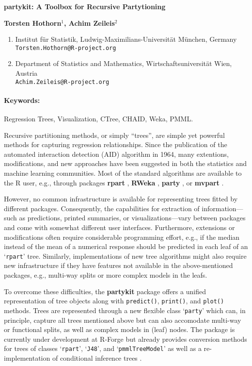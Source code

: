 \documentclass[10pt]{article}
\renewcommand{\title}[1]{\begin{center}{\bf \LARGE #1}\end{center}}
\newcommand{\keywords}{\paragraph{Keywords:}}
\let\code=\texttt
\let\pkg=\textbf
\let\proglang=\textsf
\newcommand{\class}[1]{`\code{#1}'}
\begin{document}
\pagestyle{empty}

\title{\pkg{partykit}: A Toolbox for Recursive Partytioning}

\begin{center}
  {\bf Torsten Hothorn$^{1}$, Achim Zeileis$^{2}$}
\end{center}

\begin{affiliations}
\begin{enumerate}
  \item Institut f\"ur Statistik, Ludwig-Maximilians-Universit\"at M\"unchen, Germany\\
        \texttt{Torsten.Hothorn@R-project.org}
  \item Department of Statistics and Mathematics, Wirtschaftsuniversit\"at Wien, Austria\\
        \texttt{Achim.Zeileis@R-project.org}
\end{enumerate}
\end{affiliations}

\keywords Regression Trees, Visualization, CTree, CHAID, Weka, PMML.

\vskip 0.8cm

Recursive partitioning methods, or simply ``trees'', are simple yet powerful
methods for capturing regression relationships. Since the publication of the
automated interaction detection (AID) algorithm in 1964, many extentions,
modifications, and new approaches have been suggested in both the statistics
and machine learning communities. Most of the standard algorithms are
available to the \proglang{R} user, e.g., through packages
\pkg{rpart} \citep{rpart},
\pkg{RWeka} \citep{RWeka},
\pkg{party} \citep{party}, or
\pkg{mvpart} \citep{mvpart}.

However, no common infrastructure is available for representing trees
fitted by different packages. Consequently, the capabilities for extraction of
information---such as predictions, printed summaries, or visualizations---vary
between packages and come with somewhat different user interfaces.
Furthermore, extensions or modifications often require considerable
programming effort, e.g., if the median instead of the mean of a numerical
response should be predicted in each leaf of an \class{rpart} tree.
Similarly, implementations of new tree algorithms might also require new
infrastructure if they have features not available in the above-mentioned
packages, e.g., multi-way splits or more complex models in the leafs.

To overcome these difficulties, the \pkg{partykit} package \citep{partykit} offers a 
unified representation of tree objects along with \code{predict()}, 
\code{print()}, and \code{plot()} methods. Trees are represented through 
a new flexible class \class{party} which can, in principle, capture
all trees mentioned above but can also accomodate multi-way or functional
splits, as well as complex models in (leaf) nodes. The package is currently
under development at R-Forge but already provides conversion methods for
trees of classes \class{rpart}, \class{J48}, and \class{pmmlTreeModel}
as well as a re-implementation of conditional inference trees \citep{Hothorn+Hornik+Zeileis:2006}.
\end{document}
